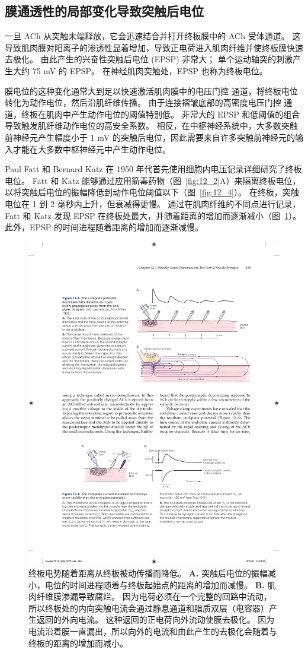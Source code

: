 \subsection{膜通透性的局部变化导致突触后电位}

一旦 ACh 从突触末端释放，它会迅速结合并打开终板膜中的 ACh 受体通道。
这导致肌肉膜对阳离子的渗透性显着增加，导致正电荷进入肌肉纤维并使终板膜快速去极化。
由此产生的兴奋性突触后电位 (EPSP) 非常大；
单个运动轴突的刺激产生大约 75 mV 的 EPSP。
在神经肌肉突触处，EPSP 也称为终板电位。


膜电位的这种变化通常大到足以快速激活肌肉膜中的电压门控  通道，将终板电位转化为动作电位，然后沿肌纤维传播。
由于连接褶皱底部的高密度电压门控  通道，终板在肌肉中产生动作电位的阈值特别低。
非常大的 EPSP 和低阈值的组合导致触发肌纤维动作电位的高安全系数。
相反，在中枢神经系统中，大多数突触前神经元产生幅度小于 1 mV 的突触后电位，因此需要来自许多突触前神经元的输入才能在大多数中枢神经元中产生动作电位。


Paul Fatt 和 Bernard Katz 在 1950 年代首先使用细胞内电压记录详细研究了终板电位。
Fatt 和 Katz 能够通过应用箭毒药物（图~\ref{fig:12_2}A）来隔离终板电位，以将突触后电位的振幅降低到动作电位阈值以下（图~\ref{fig:12_4}）。
在终板，突触电位在 1 到 2 毫秒内上升，但衰减得更慢。
通过在肌肉纤维的不同点进行记录，Fatt 和 Katz 发现 EPSP 在终板处最大，并随着距离的增加而逐渐减小（图~\ref{fig:12_5}）。
此外，EPSP 的时间进程随着距离的增加而逐渐减慢。


\begin{figure}[htbp]
	\centering
	\includegraphics[width=0.6\linewidth]{chap12/fig_12_5}
	\caption{终板电势随着距离从终板被动传播而降低。
		\textbf{A.} 突触后电位的振幅减小，电位的时间进程随着与终板起始点的距离的增加而减慢。
		\textbf{B.} 肌肉纤维膜渗漏导致腐烂。
		因为电荷必须在一个完整的回路中流动，所以终板处的内向突触电流会通过静息通道和脂质双层（电容器）产生返回的外向电流。 
		这种返回的正电荷向外流动使膜去极化。 
		因为电流沿着膜一直漏出，所以向外的电流和由此产生的去极化会随着与终板的距离的增加而减小。}
	\label{fig:12_5}
\end{figure}


